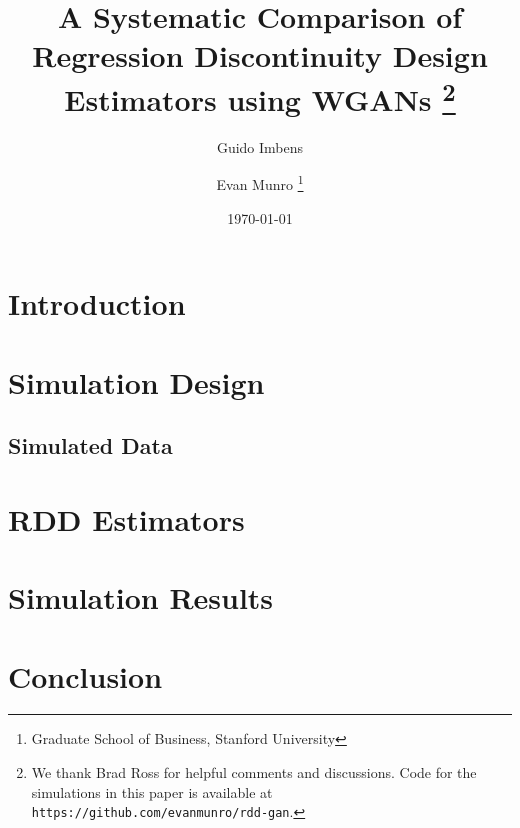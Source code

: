 \documentclass[12pt]{article}
\theoremstyle{definition}
\begin{document}
\title{A Systematic Comparison of Regression Discontinuity Design Estimators using WGANs  \thanks{
We thank Brad Ross for helpful comments and discussions. Code for the simulations in this paper is available at \texttt{https://github.com/evanmunro/rdd-gan}.}}

\author{ Guido Imbens
\and 
Evan Munro 
\thanks{Graduate School of Business, Stanford University }  } 

\date{ 
\today } 
\maketitle
\singlespacing 
{} 


\newpage 
\onehalfspacing
\section{Introduction} 

\section{Simulation Design}

\subsection{Simulated Data} 

\section{RDD Estimators}  

\section{Simulation Results} 

\section{Conclusion} 

\newpage

\end{document}
